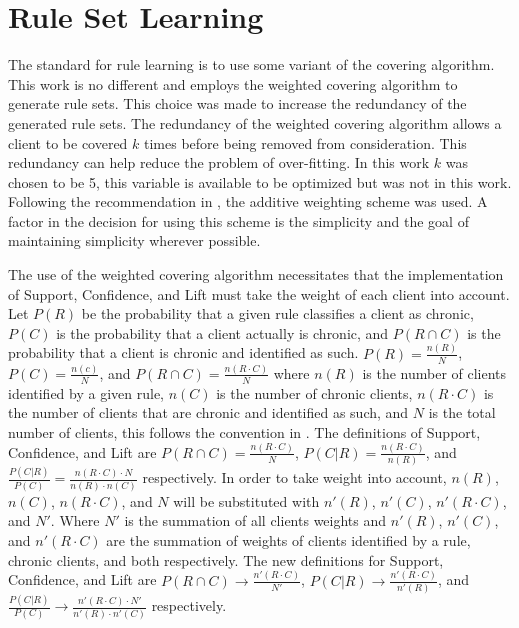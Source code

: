 
\section{Rule Set Learning}\label{chap:algo:weightcov}

The standard for rule learning is to use some variant of the covering algorithm. This work is no different and employs the weighted covering algorithm to generate rule sets. This choice was made to increase the redundancy of the generated rule sets.
The redundancy of the weighted covering algorithm allows a client to be covered $k$ times before being removed from consideration. This redundancy can help reduce the problem of over-fitting. In this work $k$ was chosen to be 5, this variable is available to be optimized but was not in this work. Following the recommendation in \cite{lavrac2004weighted}, the additive weighting scheme was used. A factor in the decision for using this scheme is the simplicity and the goal of maintaining simplicity wherever possible.

The use of the weighted covering algorithm necessitates that the implementation of Support, Confidence, and Lift must take the weight of each client into account. Let $P(R)$ be the probability that a given rule classifies a client as chronic, $P(C)$ is the probability that a client actually is chronic, and $P(R \cap C)$ is the probability that a client is chronic and identified as such. $P(R) = \frac{n(R)}{N}$, $P(C) = \frac{n(c)}{N}$, and $P(R \cap C) = \frac{n(R \cdot C)}{N}$ where $n(R)$ is the number of clients identified by a given rule, $n(C)$ is the number of chronic clients, $n(R \cdot C)$ is the number of clients that are chronic and identified as such, and $N$ is the total number of clients, this follows the convention in \cite{lavrac2004weighted}. The definitions of Support, Confidence, and Lift are $P(R \cap C) = \frac{n(R \cdot C)}{N}$, $P(C|R) = \frac{n(R \cdot C)}{n(R)}$, and $\frac{P(C|R)}{P(C)} = \frac{n(R \cdot C) \cdot N}{n(R) \cdot n(C)}$ respectively. In order to take weight into account, $n(R)$, $n(C)$, $n(R \cdot C)$, and $N$ will be substituted with $n'(R)$, $n'(C)$, $n'(R \cdot C)$, and $N'$. Where $N'$ is the summation of all clients weights and $n'(R)$, $n'(C)$, and $n'(R \cdot C)$ are the summation of weights of clients identified by a rule, chronic clients, and both respectively. The new definitions for Support, Confidence, and Lift are $P(R \cap C) \to \frac{n'(R \cdot C)}{N'}$, $P(C|R) \to \frac{n'(R \cdot C)}{n'(R)}$, and $\frac{P(C|R)}{P(C)} \to \frac{n'(R \cdot C) \cdot N'}{n'(R) \cdot n'(C)}$ respectively.


